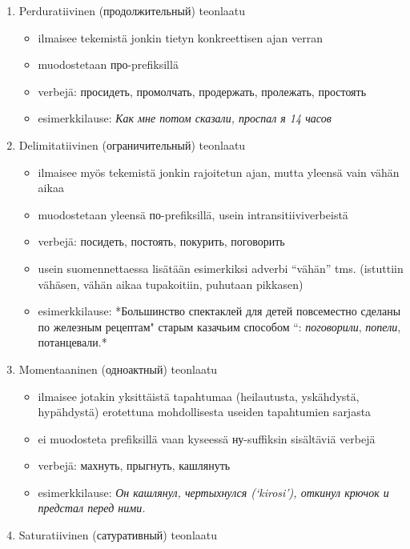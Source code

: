\documentclass[]{scrartcl}
\providecommand{\tightlist}{%
  \setlength{\itemsep}{0pt}\setlength{\parskip}{0pt}}
\begin{document}
\begin{enumerate}
\def\labelenumi{\arabic{enumi}.}
\tightlist
\item
  Perduratiivinen (продолжительный) teonlaatu

  \begin{itemize}
  \tightlist
  \item
    ilmaisee tekemistä jonkin tietyn konkreettisen ajan verran
  \item
    muodostetaan про-prefiksillä
  \item
    verbejä: просидеть, промолчать, продержать, пролежать, простоять
  \item
    esimerkkilause: \emph{Как мне потом сказали, проспал я 14 часов}
  \end{itemize}
\item
  Delimitatiivinen (ограничительный) teonlaatu

  \begin{itemize}
  \tightlist
  \item
    ilmaisee myös tekemistä jonkin rajoitetun ajan, mutta yleensä vain
    vähän aikaa
  \item
    muodostetaan yleensä по-prefiksillä, usein intransitiiviverbeistä
  \item
    verbejä: посидеть, постоять, покурить, поговорить
  \item
    usein suomennettaessa lisätään esimerkiksi adverbi ``vähän'' tms.
    (istuttiin vähäsen, vähän aikaa tupakoitiin, puhutaan pikkasen)
  \item
    esimerkkilause: *Большинство спектаклей для детей повсеместно
    сделаны по железным рецептам" старым казачьим способом ``:
    \emph{поговорили}, \emph{попели}, потанцевали.*
  \end{itemize}
\item
  Momentaaninen (одноактный) teonlaatu

  \begin{itemize}
  \tightlist
  \item
    ilmaisee jotakin yksittäistä tapahtumaa (heilautusta, yskähdystä,
    hypähdystä) erotettuna mohdollisesta useiden tapahtumien sarjasta
  \item
    ei muodosteta prefiksillä vaan kyseessä ну-suffiksin sisältäviä
    verbejä
  \item
    verbejä: махнуть, прыгнуть, кашлянуть
  \item
    esimerkkilause: \emph{Он кашлянул, чертыхнулся (`kirosi'), откинул
    крючок и предстал перед ними.}
  \end{itemize}
\item
  Saturatiivinen (сатуративный) teonlaatu


\end{enumerate}
\end{document}
